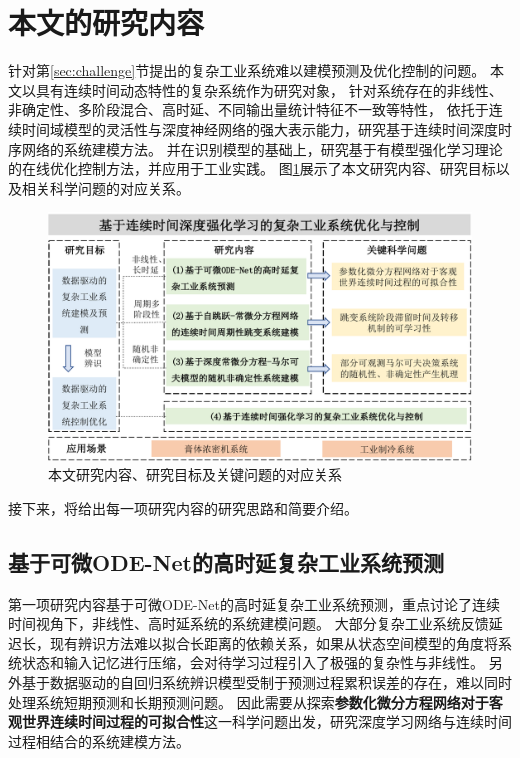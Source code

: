 \section{本文的研究内容}
针对第\ref{sec:challenge}节提出的复杂工业系统难以建模预测及优化控制的问题。
本文以具有连续时间动态特性的复杂系统作为研究对象，
针对系统存在的非线性、非确定性、多阶段混合、高时延、不同输出量统计特征不一致等特性，
依托于连续时间域模型的灵活性与深度神经网络的强大表示能力，研究基于连续时间深度时序网络的系统建模方法。
并在识别模型的基础上，研究基于有模型强化学习理论的在线优化控制方法，并应用于工业实践。
图\ref{fig:study_goal}展示了本文研究内容、研究目标以及相关科学问题的对应关系。
\begin{figure}[h]
    \includegraphics[width=\linewidth]{figures/chapter1/study_goal.pdf}
    \caption{本文研究内容、研究目标及关键问题的对应关系}
    \label{fig:study_goal}
\end{figure}
接下来，将给出每一项研究内容的研究思路和简要介绍。

\subsection{基于可微ODE-Net的高时延复杂工业系统预测}
第一项研究内容基于可微ODE-Net的高时延复杂工业系统预测，重点讨论了连续时间视角下，非线性、高时延系统的系统建模问题。
大部分复杂工业系统反馈延迟长，现有辨识方法难以拟合长距离的依赖关系，如果从状态空间模型的角度将系统状态和输入记忆进行压缩，会对待学习过程引入了极强的复杂性与非线性。
另外基于数据驱动的自回归系统辨识模型受制于预测过程累积误差的存在，难以同时处理系统短期预测和长期预测问题。
因此需要从探索\textbf{参数化微分方程网络对于客观世界连续时间过程的可拟合性}这一科学问题出发，研究深度学习网络与连续时间过程相结合的系统建模方法。

